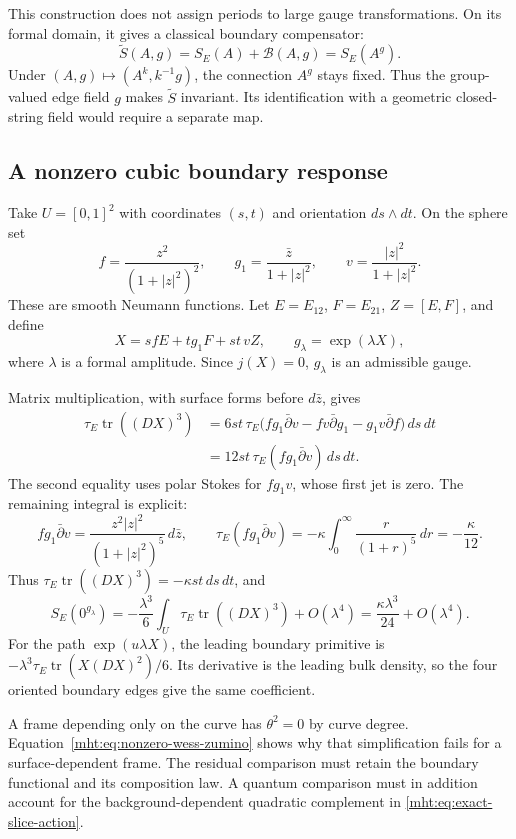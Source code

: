 This construction does not assign periods to large gauge
transformations. On its formal domain, it gives a classical boundary
compensator:
\[
 \widetilde S(A,g)=S_E(A)+\mathcal B(A,g)=S_E(A^g).
\]
Under $(A,g)\mapsto(A^k,k^{-1}g)$, the connection $A^g$ stays fixed.
Thus the group-valued edge field $g$ makes $\widetilde S$ invariant.
Its identification with a geometric closed-string field would require
a separate map.

\subsection{A nonzero cubic boundary response}

Take $U=[0,1]^2$ with coordinates $(s,t)$ and orientation $ds\wedge dt$.
On the sphere set
\[
 f=\frac{z^2}{(1+|z|^2)^2},\qquad
 g_1=\frac{\bar z}{1+|z|^2},\qquad
 v=\frac{|z|^2}{1+|z|^2}.
\]
These are smooth Neumann functions. Let
$E=E_{12}$, $F=E_{21}$, $Z=[E,F]$, and define
\[
 X=sfE+tg_1F+st\,vZ,\qquad g_\lambda=\exp(\lambda X),
\]
where $\lambda$ is a formal amplitude. Since $j(X)=0$,
$g_\lambda$ is an admissible gauge.

Matrix multiplication, with surface forms before $d\bar z$, gives
\begin{align*}
 \tau_E\operatorname{tr}((DX)^3)
 &=6st\,\tau_E\bigl(fg_1\bar\partial v-fv\bar\partial g_1
                              -g_1v\bar\partial f\bigr)\,ds\,dt\\
 &=12st\,\tau_E(fg_1\bar\partial v)\,ds\,dt.
\end{align*}
The second equality uses polar Stokes for $fg_1v$, whose first jet is
zero. The remaining integral is explicit:
\[
 fg_1\bar\partial v
      =\frac{z^2|z|^2}{(1+|z|^2)^5}\,d\bar z,\qquad
 \tau_E(fg_1\bar\partial v)
      =-\kappa\int_0^\infty\frac{r}{(1+r)^5}\,dr
      =-\frac{\kappa}{12}.
\]
Thus $\tau_E\operatorname{tr}((DX)^3)=-\kappa st\,ds\,dt$, and
\begin{equation}\label{mht:eq:nonzero-wess-zumino}
 S_E(0^{g_\lambda})
   =-\frac{\lambda^3}{6}\int_U\tau_E\operatorname{tr}((DX)^3)
             +O(\lambda^4)
   =\frac{\kappa\lambda^3}{24}+O(\lambda^4).
\end{equation}
For the path $\exp(u\lambda X)$, the leading boundary primitive is
$-\lambda^3\tau_E\operatorname{tr}(X(DX)^2)/6$.
Its derivative is the leading bulk density, so the four oriented
boundary edges give the same coefficient.

A frame depending only on the curve has $\theta^2=0$ by curve degree.
Equation~\eqref{mht:eq:nonzero-wess-zumino} shows why that simplification
fails for a surface-dependent frame. The residual comparison must retain
the boundary functional and its composition law. A quantum comparison
must in addition account for the background-dependent quadratic
complement in \eqref{mht:eq:exact-slice-action}.
